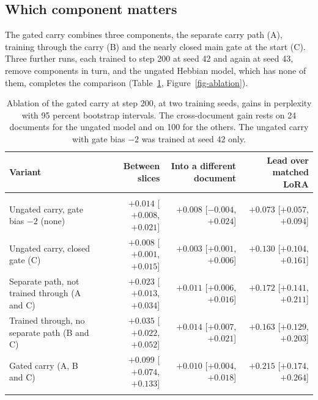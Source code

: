 \documentclass[12pt,a4paper]{report}
\begin{document}
\subsection{Which component matters}
\label{sec-ablation}

The gated carry combines three components, the separate carry path (A), training through the carry (B) and the nearly closed main gate at the start (C). Three further runs, each trained to step 200 at seed 42 and again at seed 43, remove components in turn, and the ungated Hebbian model, which has none of them, completes the comparison (Table~\ref{tab-ablation}, Figure~\ref{fig-ablation}).

\begin{table}[H]
  \centering
  \caption{Ablation of the gated carry at step 200, at two training seeds, gains in perplexity with 95 percent bootstrap intervals. The cross-document gain rests on 24 documents for the ungated model and on 100 for the others. The ungated carry with gate bias $-2$ was trained at seed 42 only.}
  \label{tab-ablation}
  \footnotesize
  \begin{tabularx}{\linewidth}{>{\raggedright\arraybackslash}Xrrr}
    \toprule
    Variant & Between slices & Into a different document & Lead over matched LoRA \\
    \midrule
    \multicolumn{4}{l}{\emph{Seed 42}} \\
    Ungated carry, gate bias $-2$ (none) & $+0.014$ {\footnotesize [$+0.008$, $+0.021$]} & $+0.008$ {\footnotesize [$-0.004$, $+0.024$]} & $+0.073$ {\footnotesize [$+0.057$, $+0.094$]} \\
    Ungated carry, closed gate (C) & $+0.008$ {\footnotesize [$+0.001$, $+0.015$]} & $+0.003$ {\footnotesize [$+0.001$, $+0.006$]} & $+0.130$ {\footnotesize [$+0.104$, $+0.161$]} \\
    Separate path, not trained through (A and C) & $+0.023$ {\footnotesize [$+0.013$, $+0.034$]} & $+0.011$ {\footnotesize [$+0.006$, $+0.016$]} & $+0.172$ {\footnotesize [$+0.141$, $+0.211$]} \\
    Trained through, no separate path (B and C) & $+0.035$ {\footnotesize [$+0.022$, $+0.052$]} & $+0.014$ {\footnotesize [$+0.007$, $+0.021$]} & $+0.163$ {\footnotesize [$+0.129$, $+0.203$]} \\
    Gated carry (A, B and C) & $+0.099$ {\footnotesize [$+0.074$, $+0.133$]} & $+0.010$ {\footnotesize [$+0.004$, $+0.018$]} & $+0.215$ {\footnotesize [$+0.174$, $+0.264$]} \\
    \midrule
    \multicolumn{4}{l}{\emph{Seed 43}} \\

\end{tabularx}
\end{table}
\end{document}
